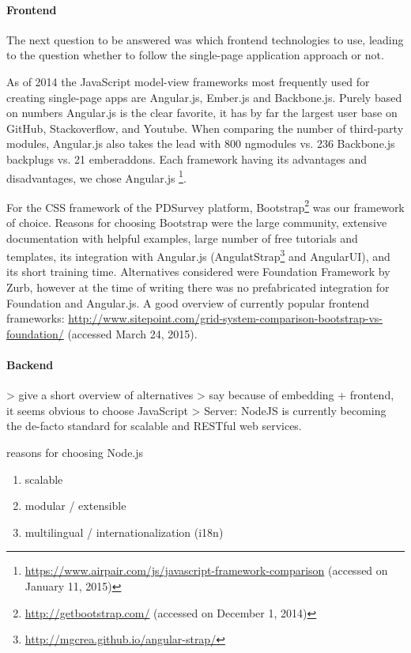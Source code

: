 	\paragraph{Frontend}

		The next question to be answered was which frontend technologies to use, leading to the question whether to follow the single-page application approach or not.

		As of 2014 the JavaScript model-view frameworks most frequently used for creating single-page apps are Angular.js, Ember.js and Backbone.js. Purely based on numbers Angular.js is the clear favorite, it has by far the largest user base on GitHub, Stackoverflow, and Youtube. When comparing the number of third-party modules, Angular.js also takes the lead with 800 ngmodules vs. 236 Backbone.js backplugs vs. 21 emberaddons. Each framework having its advantages and disadvantages, we chose Angular.js
		\footnote{\url{https://www.airpair.com/js/javascript-framework-comparison} (accessed on January 11, 2015)}.

		For the CSS framework of the PDSurvey platform, Bootstrap\footnote{\url{http://getbootstrap.com/} (accessed on December 1, 2014)} was our framework of choice. Reasons for choosing Bootstrap were the large community, extensive documentation with helpful examples, large number of free tutorials and templates, its integration with Angular.js (AngulatStrap\footnote{\url{http://mgcrea.github.io/angular-strap/}} and AngularUI), and its short training time.
		Alternatives considered were Foundation Framework by Zurb, however at the time of writing there was no prefabricated integration for Foundation and Angular.js.
		A good overview of currently popular frontend frameworks: \url{http://www.sitepoint.com/grid-system-comparison-bootstrap-vs-foundation/} (accessed March 24, 2015).
	


	\paragraph{Backend}

		> give a short overview of alternatives
		> say because of embedding + frontend, it seems obvious to choose JavaScript
		> Server: NodeJS is currently becoming the de-facto standard for scalable and RESTful web services.

		reasons for choosing Node.js

			\begin{enumerate}[itemsep=0pt] 
			\item scalable
			\item modular / extensible
			\item multilingual / internationalization (i18n)
			\end{enumerate}



